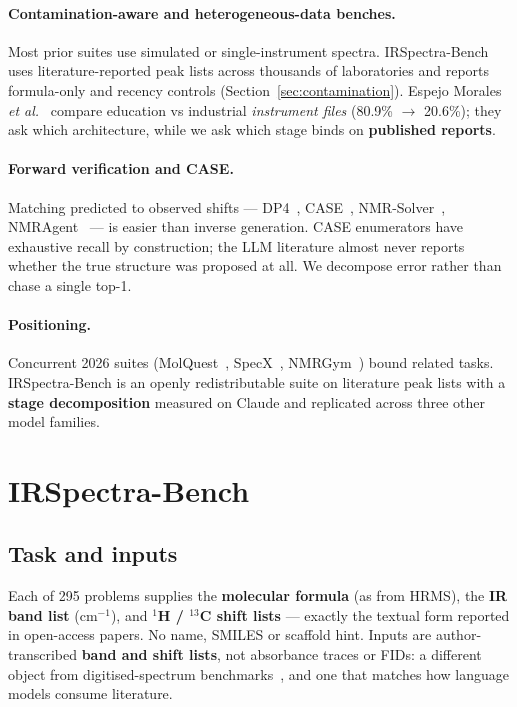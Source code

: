 \documentclass{article}
\begin{document}
\paragraph{Contamination-aware and heterogeneous-data benches.}
Most prior suites use simulated or single-instrument spectra.
IRSpectra-Bench uses literature-reported peak lists across thousands of laboratories and
reports formula-only and recency controls (Section~\ref{sec:contamination}).
Espejo Morales \textit{et al.}~\citep{espejo2026agentic} compare education vs industrial
\emph{instrument files} (80.9\% $\to$ 20.6\%); they ask which architecture, while we ask which stage
binds on \textbf{published reports}.

\paragraph{Forward verification and CASE.}
Matching predicted to observed shifts --- DP4~\citep{smith2010dp4},
CASE~\citep{elyashberg2012case}, NMR-Solver~\citep{jin2025nmrsolver},
NMRAgent~\citep{fang2026nmragent} --- is easier than inverse generation.
CASE enumerators have exhaustive recall by construction; the LLM literature almost never
reports whether the true structure was proposed at all.
We decompose error rather than chase a single top-1.

\paragraph{Positioning.}
Concurrent 2026 suites (MolQuest~\citep{han2026molquest}, SpecX~\citep{xiang2026specx},
NMRGym~\citep{fang2026nmrgym}) bound related tasks.
IRSpectra-Bench is an openly redistributable suite on literature peak lists with a \textbf{stage
decomposition} measured on Claude and replicated across three other model families.

\section{IRSpectra-Bench}
\label{sec:benchmark}

\subsection{Task and inputs}

Each of 295 problems supplies the \textbf{molecular formula} (as from HRMS), the \textbf{IR
band list} (cm$^{-1}$), and \textbf{$^1$H / $^{13}$C shift lists} --- exactly the textual form
reported in open-access papers.
No name, SMILES or scaffold hint.
Inputs are author-transcribed \textbf{band and shift lists}, not absorbance traces or FIDs:
a different object from digitised-spectrum benchmarks~\citep{espejo2026agentic}, and one that
matches how language models consume literature.
\end{document}
